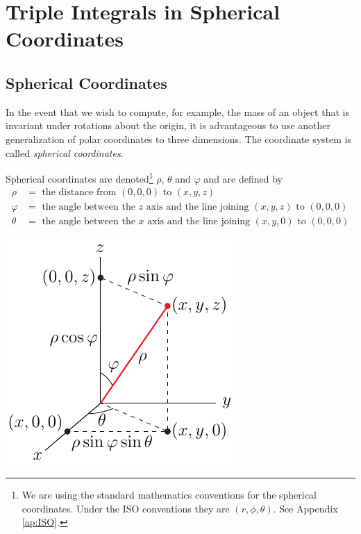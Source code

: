 \section{Triple Integrals in Spherical Coordinates} \label{sec spherical}

\subsection{Spherical Coordinates} \label{sec spherical coords}

In the event that we wish to compute, for example, the mass
of an object that is invariant under rotations about the origin,
it is advantageous to use another generalization of polar coordinates
to three dimensions. The coordinate system is called \emph{spherical
coordinates}. 
\begin{defn}\label{def spherical}
Spherical coordinates are denoted\footnote{We are using the 
standard mathematics conventions for the spherical coordinates.
Under the ISO conventions they are $(r,\phi,\theta)$. See Appendix \ref{ap:ISO}.} 
$\rho$, $\theta$ and $\varphi$ and are defined by
\begin{align*}
\rho&=\text{ the distance from }(0,0,0)\text{ to }(x,y,z)\\
\varphi&=\text{ the angle between the $z$ axis and the line joining $(x,y,z)$ to $(0,0,0)$} \\
\theta&=\text{ the angle between the $x$ axis and the line joining $(x,y,0)$ to $(0,0,0)$}
\end{align*}
\begin{efig}
\begin{center}
    \includegraphics{figures/coord/spherical.pdf}
\end{center}
\end{efig}
\end{defn}
